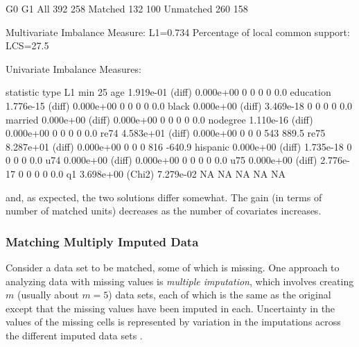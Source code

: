 \documentclass[article]{jss}
\begin{document}
\begin{Schunk}
\begin{Soutput}
           G0  G1
All       392 258
Matched   132 100
Unmatched 260 158


Multivariate Imbalance Measure: L1=0.734
Percentage of local common support: LCS=27.5%

Univariate Imbalance Measures:

          statistic   type        L1 min 25%
age       1.919e-01 (diff) 0.000e+00   0   0   0   0    0.0
education 1.776e-15 (diff) 0.000e+00   0   0   0   0    0.0
black     0.000e+00 (diff) 3.469e-18   0   0   0   0    0.0
married   0.000e+00 (diff) 0.000e+00   0   0   0   0    0.0
nodegree  1.110e-16 (diff) 0.000e+00   0   0   0   0    0.0
re74      4.583e+01 (diff) 0.000e+00   0   0   0 543  889.5
re75      8.287e+01 (diff) 0.000e+00   0   0   0 816 -640.9
hispanic  0.000e+00 (diff) 1.735e-18   0   0   0   0    0.0
u74       0.000e+00 (diff) 0.000e+00   0   0   0   0    0.0
u75       0.000e+00 (diff) 2.776e-17   0   0   0   0    0.0
q1        3.698e+00 (Chi2) 7.279e-02  NA  NA  NA  NA     NA
\end{Soutput}
\end{Schunk}

and, as expected, the two solutions differ somewhat. The gain (in
terms of number of matched units) decreases as the number of
covariates increases.

\subsubsection{Matching Multiply Imputed Data}\label{s:mvmi}

Consider a data set to be matched, some of which is missing. One
approach to analyzing data with missing values is \emph{multiple
imputation}, which involves creating $m$ (usually about $m=5$) data
sets, each of which is the same as the original except that the
missing values have been imputed in each.  Uncertainty in the values
of the missing cells is represented by variation in the imputations
across the different imputed data sets \citep{KinHonJos01}.
\end{document}
